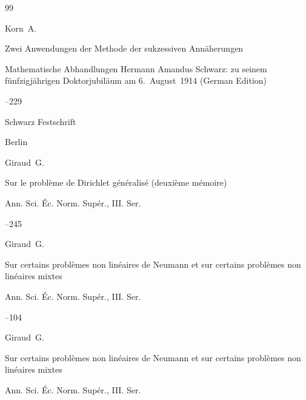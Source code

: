 \begin{thebibliography}{99}

\by Korn~A.

\paper Zwei Anwendungen der Methode der sukzessiven Ann\"aherungen

\inbook Mathematische Abhandlungen Hermann Amandus Schwarz: zu seinem f\"unfzigj\"ahrigen Doktorjubil\"aum am 6.~August~1914 (German Edition)


--229

\publ Schwarz Festschrift

\publaddr Berlin





\by Giraud~G.

\paper Sur le probl\`eme de Dirichlet g\'en\'eralis\'e (deuxi\`eme m\'emoire)

\jour Ann. Sci. \'Ec. Norm. Sup\'er.\rm, III. Ser.



--245






\by Giraud~G.

\paper Sur certains probl\`emes non lin\'eaires de Neumann et sur certains probl\`emes non lin\'eaires mixtes

\jour Ann. Sci. \'Ec. Norm. Sup\'er.\rm, III. Ser.



--104






\by Giraud~G.

\paper Sur certains probl\`emes non lin\'eaires de Neumann et sur certains probl\`emes non lin\'eaires mixtes

\jour Ann. Sci. \'Ec. Norm. Sup\'er.\rm, III. Ser.


\end{thebibliography}
